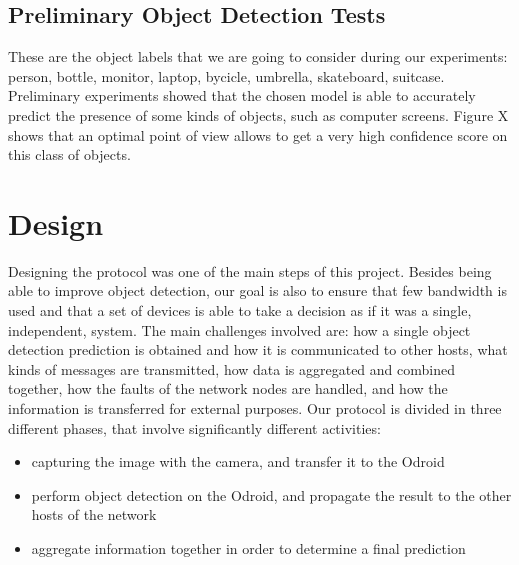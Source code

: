 \documentclass[10pt,conference,compsocconf]{IEEEtran}
\begin{document}
\subsection{Preliminary Object Detection Tests}
These are the object labels that we are going to consider during our experiments: person, bottle, monitor, laptop, bycicle, umbrella, skateboard, suitcase.
Preliminary experiments showed that the chosen model is able to accurately predict the presence of some kinds of objects, such as computer screens. Figure X shows that an optimal point of view allows to get a very high confidence score on this class of objects.
\section{Design}
\label{sec:design}
Designing the protocol was one of the main steps of this project. Besides being able to improve object detection, our goal is also to ensure that few bandwidth is used and that a set of devices is able to take a decision as if it was a single, independent, system. The main challenges involved are: how a single object detection prediction is obtained and how it is communicated to other hosts, what kinds of messages are transmitted, how data is aggregated and combined together, how the faults of the network nodes are handled, and how the information is transferred for external purposes.
Our protocol is divided in three different phases, that involve significantly different activities:
\begin{itemize}
\item capturing the image with the camera, and transfer it to the Odroid
\item perform object detection on the Odroid, and propagate the result to the other hosts of the network
\item aggregate information together in order to determine a final prediction
\end{itemize}
\end{document}
